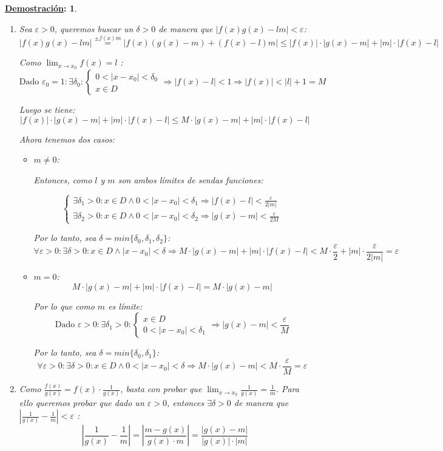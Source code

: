 \documentclass[10pt,a4paper,openright]{book}
\theoremstyle{break}
\newtheorem*{demo}{\underline{Demostración}:}
\begin{document}
\begin{demo}
\begin{enumerate}
\item Sea $\varepsilon>0$, queremos buscar un $\delta>0$ de manera que $|f(x)g(x)-lm|<\varepsilon$:
$$|f(x)g(x)-lm|\stackrel{\pm f(x)m}{=}|f(x)\left(g(x)-m\right)+\left(f(x)-l\right)m|\leq |f(x)|\cdot |g(x)-m|+|m|\cdot |f(x)-l|$$

Como $\lim_{x\rightarrow x_0}f(x)=l$ :
$$\mbox{Dado }\varepsilon_0=1: \exists \delta_0: \begin{cases} 0<|x-x_0|<\delta_0 \\ x\in D \end{cases}\Rightarrow |f(x)-l|<1\Rightarrow |f(x)|<|l|+1=M$$

Luego se tiene:
$$|f(x)|\cdot |g(x)-m|+|m|\cdot |f(x)-l|\leq M\cdot |g(x)-m|+|m|\cdot |f(x)-l|$$

Ahora tenemos dos casos:
\begin{itemize}
\item $m\neq 0$:\par
	Entonces, como $l$ y $m$ son ambos límites de sendas funciones:
	
$$\begin{cases} \exists \delta_1>0: x\in D\wedge 0<|x-x_0|<\delta_1 \Rightarrow |f(x)-l|<\frac{\varepsilon}{2|m|}\\ \exists \delta_2>0: x\in D\wedge 0<|x-x_0|<\delta_2\Rightarrow |g(x)-m|<\frac{\varepsilon}{2M}\end{cases}$$
	
	Por lo tanto, sea $\delta=min\{\delta_0,\delta_1,\delta_2\}$:
	$$\forall \varepsilon>0: \exists \delta>0: x\in D \wedge |x-x_0|<\delta\Rightarrow M\cdot |g(x)-m|+|m|\cdot |f(x)-l|<M\cdot \frac{\varepsilon}{2}+|m|\cdot \frac{\varepsilon}{2|m|}=\varepsilon$$
	
\item $m=0$:
$$M\cdot |g(x)-m|+|m|\cdot |f(x)-l|=M\cdot |g(x)-m|$$

Por lo que como $m$ es límite:
$$\mbox{Dado }\varepsilon>0: \exists \delta_1>0:\begin{cases} x\in D\\ 0<|x-x_0|<\delta_1\end{cases}\Rightarrow |g(x)-m|<\frac{\varepsilon}{M}$$

Por lo tanto, sea $\delta=min\{\delta_0, \delta_1\}$:
$$\forall \varepsilon>0: \exists \delta>0: x\in D\wedge 0<|x-x_0|<\delta\Rightarrow M\cdot |g(x)-m|< M\cdot \frac{\varepsilon}{M}=\varepsilon$$
\end{itemize}

\item Como $\frac{f(x)}{g(x)}=f(x)\cdot \frac{1}{g(x)}$, basta con probar que $\lim_{x\rightarrow x_0}\frac{1}{g(x)}=\frac{1}{m}$. Para ello queremos probar que dado un $\varepsilon>0$, entonces $\exists \delta>0$ de manera que $\left|\frac{1}{g(x)}-\frac{1}{m}\right|<\varepsilon$ :
$$\left|\frac{1}{g(x)}-\frac{1}{m}\right|=\left|\frac{m-g(x)}{g(x)\cdot m}\right|=\frac{|g(x)-m|}{|g(x)|\cdot |m|}$$


\end{enumerate}
\end{demo}
\end{document}
